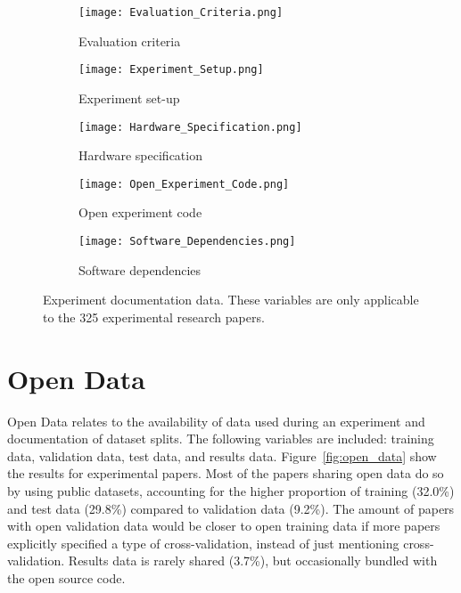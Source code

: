 \begin{figure}[!htb]
\begin{center}
    \begin{subfigure}[b]{0.4\textwidth}
        \texttt{[image: Evaluation\_Criteria.png]}
        \caption{Evaluation criteria}
        \label{fig:evaluation_criteria}
    \end{subfigure}
    \begin{subfigure}[b]{0.4\textwidth}
        \texttt{[image: Experiment\_Setup.png]}
        \caption{Experiment set-up}
        \label{fig:experiment_setup}
    \end{subfigure}
    \begin{subfigure}[b]{0.4\textwidth}
        \texttt{[image: Hardware\_Specification.png]}
        \caption{Hardware specification}
        \label{fig:hardware_specification}
    \end{subfigure}
    \begin{subfigure}[b]{0.4\textwidth}
        \texttt{[image: Open\_Experiment\_Code.png]}
        \caption{Open experiment code}
        \label{fig:open_experiment_code}
    \end{subfigure}
    \begin{subfigure}[b]{0.4\textwidth}
        \texttt{[image: Software\_Dependencies.png]}
        \caption{Software dependencies}
        \label{fig:software_dependencies}
    \end{subfigure}
    \caption[Experiment documentation data.]{Experiment documentation data. These variables are only applicable to the 325 experimental research papers.}
    \label{fig:experiment_documentation}
\end{center}
\end{figure}

\section{Open Data}
Open Data relates to the availability of data used during an experiment and documentation of dataset splits. The following variables are included: training data, validation data, test data, and results data. Figure~\ref{fig:open_data} show the results for experimental papers. Most of the papers sharing open data do so by using public datasets, accounting for the higher proportion of training (32.0\%) and test data (29.8\%) compared to validation data (9.2\%). The amount of papers with open validation data would be closer to open training data if more papers explicitly specified a type of cross-validation, instead of just mentioning cross-validation. Results data is rarely shared (3.7\%), but occasionally bundled with the open source code.

